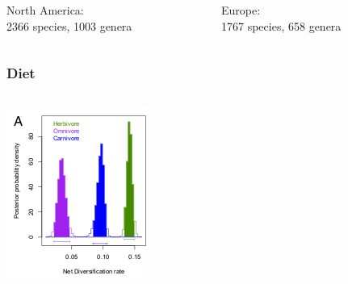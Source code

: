 \documentclass{beamer}
\begin{document}
\begin{frame}
  \vspace{0.2cm}

  \begin{columns}
    \begin{column}{0.5\textwidth}
      North America: \\2366 species, 1003 genera 
    \end{column}
    \begin{column}{0.5\textwidth}
      Europe: \\1767 species, 658 genera
    \end{column}
  \end{columns}

\end{frame}

\begin{frame}
  \frametitle{Diet}

  \begin{columns}
    \begin{column}{0.5\textwidth}
      \includegraphics[height=0.5\textheight,width=\textwidth,keepaspectratio=true]{figure/dietdiv}


\end{column}
\end{columns}
\end{frame}
\end{document}
